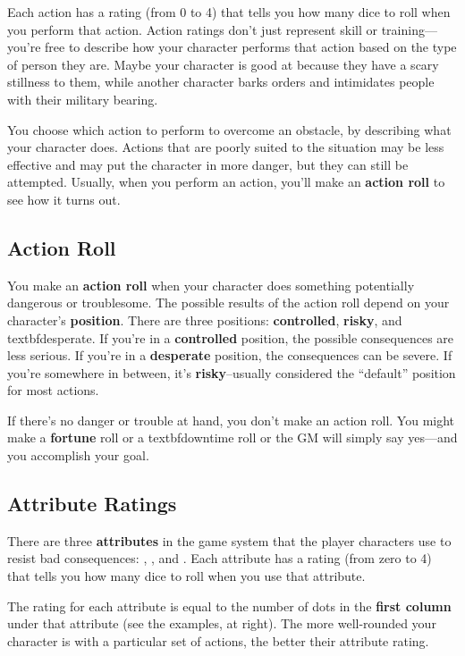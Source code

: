Each action has a rating (from 0 to 4) that tells you how many dice to roll when you perform that action. Action ratings don’t just represent skill or training—you’re free to describe how your character performs that action based on the type of person they are. Maybe your character is good at  because they have a scary stillness to them, while another character barks orders and intimidates people with their military bearing.

You choose which action to perform to overcome an obstacle, by describing what your character does. Actions that are poorly suited to the situation may be less effective and may put the character in more danger, but they can still be attempted. Usually, when you perform an action, you’ll make an \textbf{action roll} to see how it turns out.

\subsection{Action Roll}

You make an \textbf{action roll} when your character does something potentially dangerous or troublesome. The possible results of the action roll depend on your character’s \textbf{position}. There are three positions: \textbf{controlled}, \textbf{risky}, and textbf{desperate}. If you’re in a \textbf{controlled} position, the possible consequences are less serious. If you’re in a \textbf{desperate} position, the consequences can be severe. If you’re somewhere in between, it’s \textbf{risky}--usually considered the ``default'' position for most actions.

If there’s no danger or trouble at hand, you don’t make an action roll. You might make a \textbf{fortune} roll or a textbf{downtime} roll or the GM will simply say yes—and you accomplish your goal.

\subsection{Attribute Ratings}

There are three \textbf{attributes} in the game system that the player characters use to resist bad consequences: , , and . Each attribute has a rating (from zero to 4) that tells you how many dice to roll when you use that attribute.

The rating for each attribute is equal to the number of dots in the \textbf{first column} under that attribute (see the examples, at right). The more well-rounded your character is with a particular set of actions, the better their attribute rating.

